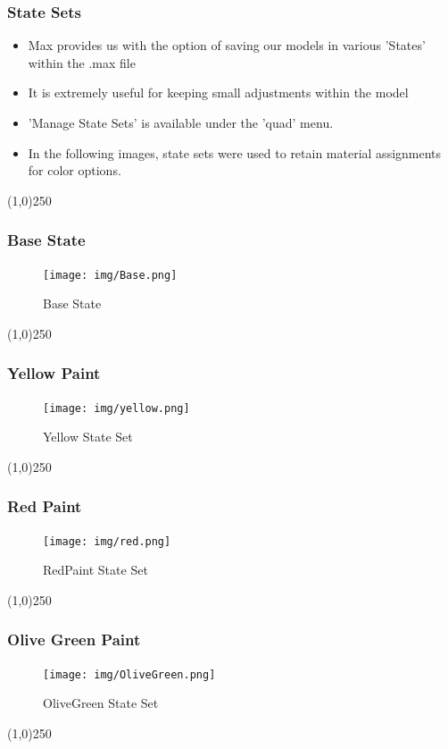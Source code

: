 \begin{frame}
\frametitle{State Sets}
\begin{itemize}
	\item Max provides us with the option of saving our models in various 'States' within the .max file
	\item It is extremely useful for keeping small adjustments within the model
	\item 'Manage State Sets' is available under the 'quad' menu.
	\item In the following images, state sets were used to retain material assignments for color options.
\end{itemize}
\end{frame}
\begin{center}\line(1,0){250}\end{center}


\begin{frame}
\frametitle{Base State}
\begin{figure}
\centering
\texttt{[image: img/Base.png]}
\caption{Base State}
\label{fig:BaseState}
\end{figure}
\end{frame}
\begin{center}\line(1,0){250}\end{center}

\begin{frame}
\frametitle{Yellow Paint}
\begin{figure}
\centering
\texttt{[image: img/yellow.png]}
\caption{Yellow State Set}
\label{fig:yellow}
\end{figure}
\end{frame}
\begin{center}\line(1,0){250}\end{center}

\begin{frame}
\frametitle{Red Paint}
\begin{figure}
\centering
\texttt{[image: img/red.png]}
\caption{RedPaint State Set}
\label{fig:RedPaint}
\end{figure}
\end{frame}
\begin{center}\line(1,0){250}\end{center}

\begin{frame}
\frametitle{Olive Green Paint}
\begin{figure}
\centering
\texttt{[image: img/OliveGreen.png]}
\caption{OliveGreen State Set}
\label{fig:OliveGreen}
\end{figure}
\end{frame}
\begin{center}\line(1,0){250}\end{center}


